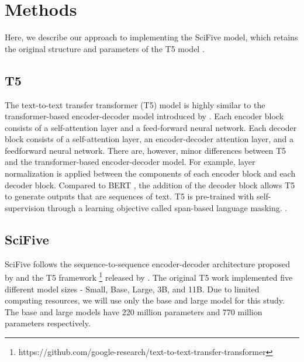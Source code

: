 \documentclass[nocrop]{bioinfo}
\begin{document}
\section{Methods}
\begin{methods}
Here, we describe our approach to implementing the SciFive model, which retains the original structure and parameters of the T5 model \citep{DBLP:journals/corr/abs-1910-10683}.

\subsection{T5}
The text-to-text transfer transformer (T5) model \citep{DBLP:journals/corr/abs-1910-10683} is highly similar to the transformer-based encoder-decoder model introduced by \cite{DBLP:journals/corr/VaswaniSPUJGKP17}. Each encoder block consists of a self-attention layer and a feed-forward neural network. Each decoder block consists of a self-attention layer, an encoder-decoder attention layer, and a feedforward neural network. There are, however, minor differences between T5 and the transformer-based encoder-decoder model. For example, layer normalization is applied between the components of each encoder block and each decoder block. Compared to BERT \citep{DBLP:journals/corr/abs-1810-04805}, the addition of the decoder block allows T5 to generate outputs that are sequences of text. T5 is pre-trained with self-supervision through a learning objective called span-based language masking. \citep{DBLP:journals/corr/abs-1910-10683}.


\subsection{SciFive}
SciFive follows the sequence-to-sequence encoder-decoder architecture proposed by \cite{DBLP:journals/corr/VaswaniSPUJGKP17} and the T5 framework \footnote{https://github.com/google-research/text-to-text-transfer-transformer} released by \cite{DBLP:journals/corr/abs-1910-10683}. The original T5 work implemented five different model sizes - Small, Base, Large, 3B, and 11B. Due to limited computing resources, we will use only the base and large model for this study. The base and large models have 220 million parameters and 770 million parameters respectively.


\end{methods}
\end{document}
